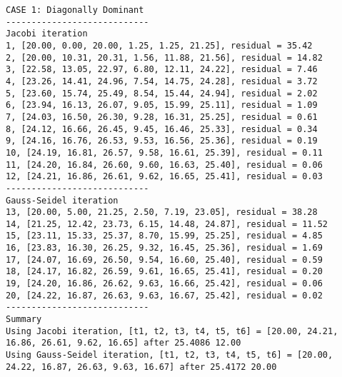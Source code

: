 \documentclass[11pt]{article}
\begin{document}
\label{}
\begin{verbatim}
CASE 1: Diagonally Dominant
----------------------------
Jacobi iteration
1, [20.00, 0.00, 20.00, 1.25, 1.25, 21.25], residual = 35.42
2, [20.00, 10.31, 20.31, 1.56, 11.88, 21.56], residual = 14.82
3, [22.58, 13.05, 22.97, 6.80, 12.11, 24.22], residual = 7.46
4, [23.26, 14.41, 24.96, 7.54, 14.75, 24.28], residual = 3.72
5, [23.60, 15.74, 25.49, 8.54, 15.44, 24.94], residual = 2.02
6, [23.94, 16.13, 26.07, 9.05, 15.99, 25.11], residual = 1.09
7, [24.03, 16.50, 26.30, 9.28, 16.31, 25.25], residual = 0.61
8, [24.12, 16.66, 26.45, 9.45, 16.46, 25.33], residual = 0.34
9, [24.16, 16.76, 26.53, 9.53, 16.56, 25.36], residual = 0.19
10, [24.19, 16.81, 26.57, 9.58, 16.61, 25.39], residual = 0.11
11, [24.20, 16.84, 26.60, 9.60, 16.63, 25.40], residual = 0.06
12, [24.21, 16.86, 26.61, 9.62, 16.65, 25.41], residual = 0.03
----------------------------
Gauss-Seidel iteration
13, [20.00, 5.00, 21.25, 2.50, 7.19, 23.05], residual = 38.28
14, [21.25, 12.42, 23.73, 6.15, 14.48, 24.87], residual = 11.52
15, [23.11, 15.33, 25.37, 8.70, 15.99, 25.25], residual = 4.85
16, [23.83, 16.30, 26.25, 9.32, 16.45, 25.36], residual = 1.69
17, [24.07, 16.69, 26.50, 9.54, 16.60, 25.40], residual = 0.59
18, [24.17, 16.82, 26.59, 9.61, 16.65, 25.41], residual = 0.20
19, [24.20, 16.86, 26.62, 9.63, 16.66, 25.42], residual = 0.06
20, [24.22, 16.87, 26.63, 9.63, 16.67, 25.42], residual = 0.02
----------------------------
Summary
Using Jacobi iteration, [t1, t2, t3, t4, t5, t6] = [20.00, 24.21, 16.86, 26.61, 9.62, 16.65] after 25.4086 12.00
Using Gauss-Seidel iteration, [t1, t2, t3, t4, t5, t6] = [20.00, 24.22, 16.87, 26.63, 9.63, 16.67] after 25.4172 20.00
\end{verbatim}
\end{document}
